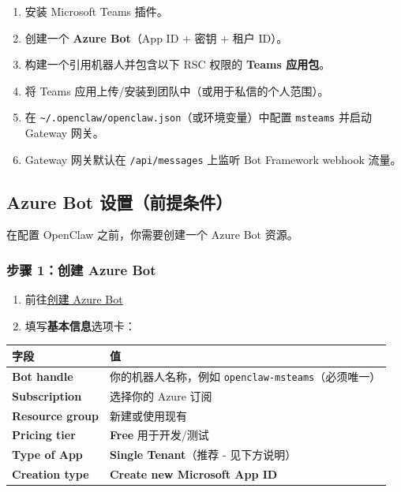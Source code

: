 \begin{enumerate}
  \item 安装 Microsoft Teams 插件。
  \item 创建一个 \textbf{Azure Bot}（App ID + 密钥 + 租户 ID）。
  \item 构建一个引用机器人并包含以下 RSC 权限的 \textbf{Teams 应用包}。
  \item 将 Teams 应用上传/安装到团队中（或用于私信的个人范围）。
  \item 在 \texttt{\textasciitilde{}/.openclaw/openclaw.json}（或环境变量）中配置 \texttt{msteams} 并启动 Gateway 网关。
  \item Gateway 网关默认在 \texttt{/api/messages} 上监听 Bot Framework webhook 流量。
\end{enumerate}


\subsection{Azure Bot 设置（前提条件）}


在配置 OpenClaw 之前，你需要创建一个 Azure Bot 资源。

\subsubsection{步骤 1：创建 Azure Bot}


\begin{enumerate}
  \item 前往\href{https://portal.azure.com/\#create/Microsoft.AzureBot}{创建 Azure Bot}
  \item 填写\textbf{基本信息}选项卡：
\end{enumerate}



\begin{table}[h]
\centering
\small
\begin{tabular}{|l|l|}
\hline
字段 & 值 \\
\hline
\textbf{Bot handle} & 你的机器人名称，例如 \texttt{openclaw-msteams}（必须唯一） \\
\hline
\textbf{Subscription} & 选择你的 Azure 订阅 \\
\hline
\textbf{Resource group} & 新建或使用现有 \\
\hline
\textbf{Pricing tier} & \textbf{Free} 用于开发/测试 \\
\hline
\textbf{Type of App} & \textbf{Single Tenant}（推荐 - 见下方说明） \\
\hline
\textbf{Creation type} & \textbf{Create new Microsoft App ID} \\
\hline
\end{tabular}
\end{table}



